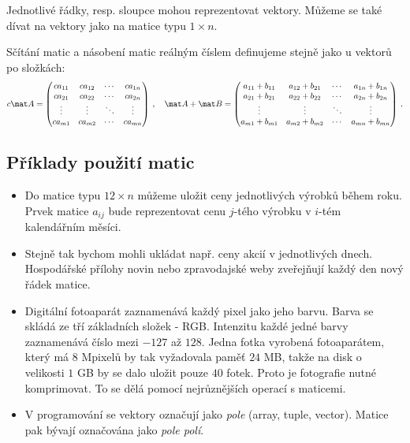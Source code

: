 Jednotlivé řádky, resp. sloupce mohou reprezentovat vektory. Můžeme se také dívat na vektory jako na matice typu $1 \times n$.

Sčítání matic a násobení matic reálným číslem definujeme stejně jako u vektorů po složkách:
\begin{align}
    c \mat A = \begin{pmatrix}
        c a_{11} & c a_{12}  & \cdots & c a_{1n} \\
        c a_{21} & c a_{22}  & \cdots & c a_{2n} \\
        \vdots & \vdots & \ddots & \vdots \\
        c a_{m1} & c a_{m2} & \cdots & c a_{mn} 
    \end{pmatrix} \:, 
    \quad 
    \mat A + \mat B = \begin{pmatrix}
        a_{11} + b_{11} & a_{12} + b_{21}  & \cdots & a_{1n}+ b_{1n} \\
        a_{21} + b_{21} & a_{22} + b_{22} & \cdots & a_{2n} + b_{2n}\\
        \vdots & \vdots & \ddots & \vdots \\
        a_{m1} + b_{m1} & a_{m2} + b_{m2} & \cdots & a_{mn} + b_{mn} 
    \end{pmatrix} \:.
\end{align}

\subsection*{Příklady použití matic}

\begin{itemize}
    \item Do matice typu $12 \times n$ můžeme uložit ceny jednotlivých výrobků během roku. Prvek matice $a_{ij}$ bude reprezentovat cenu $j$-tého výrobku v $i$-tém kalendářním měsíci.
    \item Stejně tak bychom mohli ukládat např. ceny akcií v jednotlivých dnech. Hospodářské přílohy novin nebo zpravodajské weby zveřejňují každý den nový řádek matice.
    \item Digitální fotoaparát zaznamenává každý pixel jako jeho barvu. Barva se skládá ze tří základních složek - RGB. Intenzitu každé jedné barvy zaznamenává číslo mezi $-127$ až $128$. Jedna fotka vyrobená fotoaparátem, který má $8$ Mpixelů by tak vyžadovala paměť $24$ MB, takže na disk o velikosti $1$ GB by se dalo uložit pouze $40$ fotek. Proto je fotografie nutné komprimovat. To se dělá pomocí nejrůznějších operací s maticemi.
    \item V programování se vektory označují jako \textit{pole} (array, tuple, vector). Matice pak bývají označována jako \textit{pole polí}.
\end{itemize}

